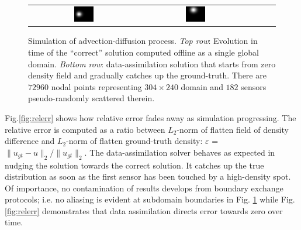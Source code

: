 \documentclass[acmsmall,review,anonymous]{acmart}\settopmatter{printfolios=true,printccs=false,printacmref=false}
\begin{document}
\begin{figure}
\begin{tabular}{ccccc}
\includegraphics[width=0.19\textwidth]{images/field-t=3006} &
\includegraphics[width=0.19\textwidth]{images/field-t=4089} 
\end{tabular}
\caption{Simulation of advection-diffusion process. \textit{Top row}: Evolution in time of the ``correct'' solution computed offline as a single global domain. \textit{Bottom row}: data-assimilation solution that starts from zero density field and gradually catches up the ground-truth. There are $72960$ nodal points representing $304{\times}240$ domain and $182$ sensors pseudo-randomly scattered therein.}
\label{fig:density}
\end{figure}

Fig.\ref{fig:relerr} shows how relative error fades away as simulation progressing. The relative error is computed as a ratio between $L_2$-norm of flatten field of density difference and  $L_2$-norm of flatten ground-truth density: $\varepsilon$ = $\|u_{gt} - u\|_2/\|u_{gt}\|_2$. The data-assimilation solver behaves as expected in nudging the solution towards the correct solution. It catches up the true distribution as soon as the first sensor has been touched by a high-density spot. Of importance, no contamination of results develops from boundary exchange protocols; i.e.  no aliasing is evident at subdomain boundaries in Fig. \ref{fig:density} while Fig. \ref{fig:relerr} demonstrates that data assimilation directs error towards zero over time. 
\end{document}

